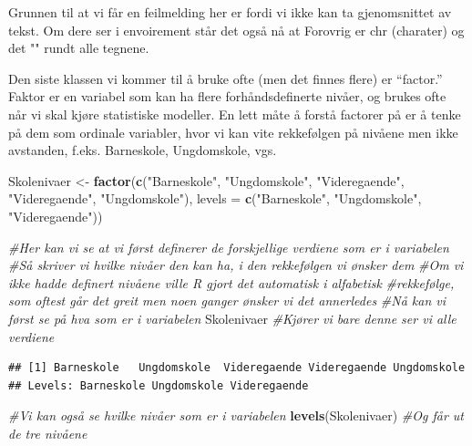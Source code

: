 \documentclass[
]{article}
\newenvironment{Shaded}{\begin{snugshade}}{\end{snugshade}}
\newcommand{\CommentTok}[1]{\textcolor[rgb]{0.56,0.35,0.01}{\textit{#1}}}
\newcommand{\DataTypeTok}[1]{\textcolor[rgb]{0.13,0.29,0.53}{#1}}
\newcommand{\KeywordTok}[1]{\textcolor[rgb]{0.13,0.29,0.53}{\textbf{#1}}}
\newcommand{\NormalTok}[1]{#1}
\newcommand{\StringTok}[1]{\textcolor[rgb]{0.31,0.60,0.02}{#1}}
\begin{document}
Grunnen til at vi får en feilmelding her er fordi vi ikke kan ta
gjenomsnittet av tekst. Om dere ser i envoirement står det også nå at
Forovrig er chr (charater) og det "" rundt alle tegnene.

Den siste klassen vi kommer til å bruke ofte (men det finnes flere) er
``factor.'' Faktor er en variabel som kan ha flere forhåndsdefinerte
nivåer, og brukes ofte når vi skal kjøre statistiske modeller. En lett
måte å forstå factorer på er å tenke på dem som ordinale variabler, hvor
vi kan vite rekkefølgen på nivåene men ikke avstanden, f.eks.
Barneskole, Ungdomskole, vgs.

\begin{Shaded}
\begin{Highlighting}[]
\NormalTok{Skolenivaer <-}\StringTok{ }\KeywordTok{factor}\NormalTok{(}\KeywordTok{c}\NormalTok{(}\StringTok{"Barneskole"}\NormalTok{, }\StringTok{"Ungdomskole"}\NormalTok{, }\StringTok{"Videregaende"}\NormalTok{, }\StringTok{"Videregaende"}\NormalTok{, }\StringTok{"Ungdomskole"}\NormalTok{),}
\DataTypeTok{levels =} \KeywordTok{c}\NormalTok{(}\StringTok{"Barneskole"}\NormalTok{, }\StringTok{"Ungdomskole"}\NormalTok{, }\StringTok{"Videregaende"}\NormalTok{))}

\CommentTok{#Her kan vi se at vi først definerer de forskjellige verdiene som er i variabelen}
\CommentTok{#Så skriver vi hvilke nivåer den kan ha, i den rekkefølgen vi ønsker dem}
\CommentTok{#Om vi ikke hadde definert nivåene ville R gjort det automatisk i alfabetisk}
\CommentTok{#rekkefølge, som oftest går det greit men noen ganger ønsker vi det annerledes}
\CommentTok{#Nå kan vi først se på hva som er i variabelen}
\NormalTok{Skolenivaer }\CommentTok{#Kjører vi bare denne ser vi alle verdiene}
\end{Highlighting}
\end{Shaded}

\begin{verbatim}
## [1] Barneskole   Ungdomskole  Videregaende Videregaende Ungdomskole 
## Levels: Barneskole Ungdomskole Videregaende
\end{verbatim}

\begin{Shaded}
\begin{Highlighting}[]
\CommentTok{#Vi kan også se hvilke nivåer som er i variabelen}
\KeywordTok{levels}\NormalTok{(Skolenivaer) }\CommentTok{#Og får ut de tre nivåene}
\end{Highlighting}
\end{Shaded}
\end{document}
